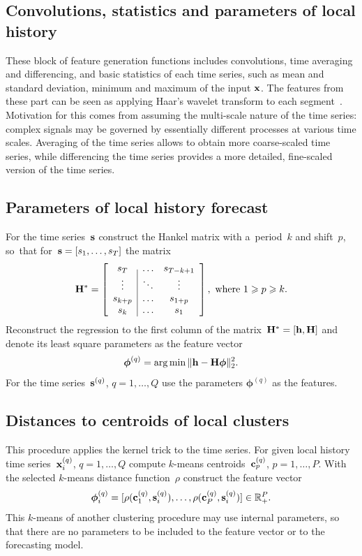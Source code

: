 \documentclass[conference]{IEEEtran}
\begin{document}
\subsection{Convolutions, statistics and parameters of local history}
These block of feature generation functions includes convolutions, time averaging and differencing, and basic statistics of each time series, such as mean and standard deviation, minimum and maximum of the input ${\mathbf{x}}$. The features from these part can be seen as applying Haar's wavelet transform to each segment~\cite{Jiang2011}. Motivation for this comes from assuming the multi-scale nature of the time series: complex signals may be governed by essentially different processes at various time scales. Averaging of the time series allows to obtain more coarse-scaled time series, while differencing the time series provides a more detailed, fine-scaled version of the time series.


\subsection{Parameters of local history forecast}
For the time series~${\mathbf{s}}$ construct the Hankel matrix with a~period~$k$ and shift~$p$, so~that for~${\mathbf{s}} = [s_1,\dots,s_T]$ the matrix
\[
\mathbf{H}^* =
\left[ \begin{array}{c|cc}
s_T  & \dots & s_{T-k+1} \\
\vdots & \ddots & \vdots \\
s_{k+p} & \dots & s_{1+p}\\
s_k & \dots & s_1 \\
\end{array}
\right],
\text{~where~} 1\geqslant p \geqslant k .
\]
Reconstruct the regression to the first column of the matrix~$\mathbf{H}^*=[{\mathbf{h}}, \mathbf{H}]$ and denote its least square parameters as the feature vector
\[
\boldsymbol{\phi}^{(q)} = \arg\min \| {\mathbf{h}}-\mathbf{H} \boldsymbol{\phi}\|_2^2.
\]
For the time series~${\mathbf{s}}^{(q)}$, $q=1,\dots, Q$ use the parameters $\boldsymbol{\phi}^{(q)}$ as the features.

\subsection{Distances to centroids of local clusters}
This procedure applies the kernel trick to the time series. For given local history time series~${\mathbf{x}}_i^{(q)}$, $q=1,\dots, Q$ compute $k$-means centroids~${\mathbf{c}}_p^{(q)}$, $p = 1, \dots, P$.  With the selected $k$-means distance function~$\rho$ construct the feature vector
\[
{\boldsymbol{\phi}}_i^{(q)} = [\rho({\mathbf{c}}_1^{(q)},{\mathbf{s}}_i^{(q)}),\dots,\rho({\mathbf{c}}^{(q)}_P,{\mathbf{s}}_i^{(q)})] \in \mathbb{R}_+^P.
\]
This $k$-means of another clustering procedure may use internal parameters, so that there are no parameters to be included to the feature vector or to the forecasting model.
\end{document}
